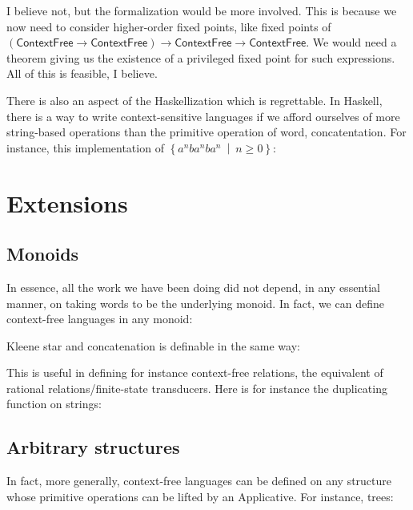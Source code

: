I believe not, but the formalization would be more involved. This is because we now need to consider higher-order fixed points, like fixed points of $(\textsf{ContextFree}\rightarrow \textsf{ContextFree})\rightarrow  \textsf{ContextFree}\rightarrow \textsf{ContextFree}$. We would need a theorem giving us the existence of a privileged fixed point for such expressions. All of this is feasible, I believe.

There is also an aspect of the Haskellization which is regrettable. In Haskell, there is a way to write context-sensitive languages if we afford ourselves of more string-based operations than the primitive operation of word, concatentation. For instance, this implementation of $\left\lbrace a^nba^nba^n\ \middle|\ n\geq 0\right\rbrace$:





\section{Extensions}

\subsection{Monoids}

In essence, all the work we have been doing did not depend, in any essential manner, on taking words to be the underlying monoid. In fact, we can define context-free languages in any monoid:



Kleene star and concatenation is definable in the same way:



This is useful in defining for instance context-free relations, the equivalent of rational relations/finite-state transducers. Here is for instance the duplicating function on strings:



\subsection{Arbitrary structures}

In fact, more generally, context-free languages can be defined on any structure whose primitive operations can be lifted by an Applicative. For instance, trees:






